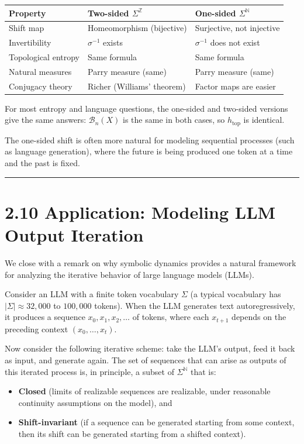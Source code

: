\begin{tabular}{|l|l|l|}
\hline
Property & Two-sided $\Sigma^{\mathbb{Z}}$ & One-sided $\Sigma^{\mathbb{N}}$ \\
\hline
Shift map & Homeomorphism (bijective) & Surjective, not injective \\
Invertibility & $\sigma^{-1}$ exists & $\sigma^{-1}$ does not exist \\
Topological entropy & Same formula & Same formula \\
Natural measures & Parry measure (same) & Parry measure (same) \\
Conjugacy theory & Richer (Williams' theorem) & Factor maps are easier \\
\hline
\end{tabular}


For most entropy and language questions, the one-sided and two-sided versions give the same answers: $\mathcal{B}_n(X)$ is the same in both cases, so $h_{\text{top}}$ is identical.

The one-sided shift is often more natural for modeling sequential processes (such as language generation), where the future is being produced one token at a time and the past is fixed.

\bigskip\hrule\bigskip

\section{2.10 Application: Modeling LLM Output Iteration}

We close with a remark on why symbolic dynamics provides a natural framework for analyzing the iterative behavior of large language models (LLMs).

Consider an LLM with a finite token vocabulary $\Sigma$ (a typical vocabulary has $|\Sigma| \approx 32{,}000$ to $100{,}000$ tokens). When the LLM generates text autoregressively, it produces a sequence $x_0, x_1, x_2, \ldots$ of tokens, where each $x_{t+1}$ depends on the preceding context $(x_0, \ldots, x_t)$.

Now consider the following iterative scheme: take the LLM's output, feed it back as input, and generate again. The set of sequences that can arise as outputs of this iterated process is, in principle, a subset of $\Sigma^{\mathbb{N}}$ that is:

\begin{itemize}
  \item \textbf{Closed} (limits of realizable sequences are realizable, under reasonable continuity assumptions on the model), and
  \item \textbf{Shift-invariant} (if a sequence can be generated starting from some context, then its shift can be generated starting from a shifted context).
\end{itemize}

